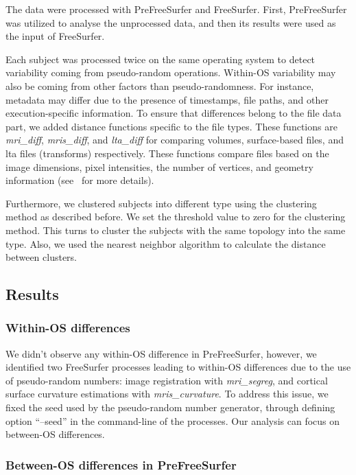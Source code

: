 \documentclass[a4paper,num-refs]{oup-contemporary}
\begin{document}
The data were processed with PreFreeSurfer and FreeSurfer. 
First, PreFreeSurfer was utilized to analyse the unprocessed data, and then its 
results were used as the input of FreeSurfer.

Each subject was processed twice on the same operating system to detect
variability coming from pseudo-random operations. 
Within-OS variability may also be coming from other factors than pseudo-randomness. 
For instance, metadata may differ due to the presence of timestamps, 
file paths, and other execution-specific information. 
To ensure that differences belong to the file data part, 
we added distance functions specific to the file types.
These functions are \emph{mri\_diff}, \emph{mris\_diff}, and \emph{lta\_diff} 
for comparing volumes, surface-based files, 
and lta files (transforms) respectively. 
These functions compare files based on the image dimensions, 
pixel intensities, the number of vertices, and geometry information
(see~\cite{fischl2012freesurfer} for more details). 

Furthermore, we clustered subjects into different type using 
the clustering method as described before.
We set the threshold value to zero for the clustering method. 
This turns to cluster the subjects with the same topology into the same type.
Also, we used the nearest neighbor algorithm to calculate the distance between clusters.

\subsection{Results}

\subsubsection{Within-OS differences}

We didn't observe any within-OS difference in PreFreeSurfer, however, we
identified two FreeSurfer processes leading to within-OS differences due
to the use of pseudo-random numbers: image registration with
\emph{mri\_segreg}, and cortical surface curvature
estimations with \emph{mris\_curvature}. To address this issue, we fixed
the seed used by the pseudo-random number generator, through defining 
option ``--seed'' in the command-line of the processes.
Our analysis can focus on between-OS differences. 

\subsubsection{Between-OS differences in PreFreeSurfer}
\end{document}
